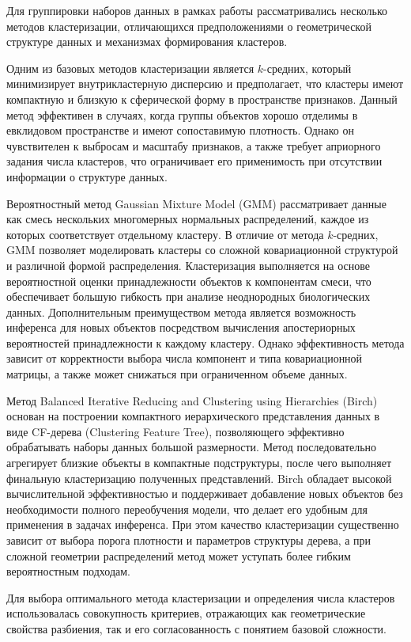 \documentclass[specification,annotation,times]{itmo-student-thesis}
\begin{document}
Для группировки наборов данных в рамках работы рассматривались несколько методов кластеризации, отличающихся предположениями о геометрической структуре данных и механизмах формирования кластеров.

Одним из базовых методов кластеризации является $k$-средних, который минимизирует внутрикластерную дисперсию и предполагает, что кластеры имеют компактную и близкую к сферической форму в пространстве признаков. Данный метод эффективен в случаях, когда группы объектов хорошо отделимы в евклидовом пространстве и имеют сопоставимую плотность. Однако он чувствителен к выбросам и масштабу признаков, а также требует априорного задания числа кластеров, что ограничивает его применимость при отсутствии информации о структуре данных.

Вероятностный метод Gaussian Mixture Model (GMM) рассматривает данные как смесь нескольких многомерных нормальных распределений, каждое из которых соответствует отдельному кластеру. В отличие от метода $k$-средних, GMM позволяет моделировать кластеры со сложной ковариационной структурой и различной формой распределения. Кластеризация выполняется на основе вероятностной оценки принадлежности объектов к компонентам смеси, что обеспечивает большую гибкость при анализе неоднородных биологических данных. Дополнительным преимуществом метода является возможность инференса для новых объектов посредством вычисления апостериорных вероятностей принадлежности к каждому кластеру. Однако эффективность метода зависит от корректности выбора числа компонент и типа ковариационной матрицы, а также может снижаться при ограниченном объеме данных.

Метод Balanced Iterative Reducing and Clustering using Hierarchies (Birch) основан на построении компактного иерархического представления данных в виде CF-дерева (Clustering Feature Tree), позволяющего эффективно обрабатывать наборы данных большой размерности. Метод последовательно агрегирует близкие объекты в компактные подструктуры, после чего выполняет финальную кластеризацию полученных представлений. Birch обладает высокой вычислительной эффективностью и поддерживает добавление новых объектов без необходимости полного переобучения модели, что делает его удобным для применения в задачах инференса. При этом качество кластеризации существенно зависит от выбора порога плотности и параметров структуры дерева, а при сложной геометрии распределений метод может уступать более гибким вероятностным подходам.

Для выбора оптимального метода кластеризации и определения числа кластеров использовалась совокупность критериев, отражающих как геометрические свойства разбиения, так и его согласованность с понятием базовой сложности.
\end{document}
